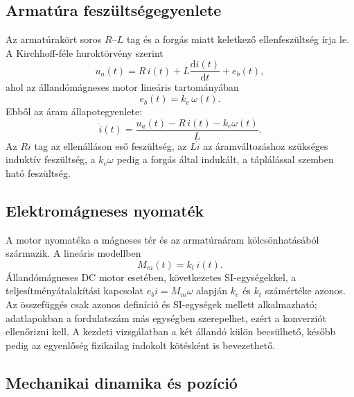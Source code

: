 \documentclass[11pt,a4paper]{article}
\newcommand{\dd}{\mathrm{d}}
\begin{document}
\subsection{Armatúra feszültségegyenlete}

Az armatúrakört soros $R$--$L$ tag és a forgás miatt keletkező ellenfeszültség írja le. A Kirchhoff-féle huroktörvény szerint
\begin{equation}
  u_a(t)=R\,i(t)+L\frac{\dd i(t)}{\dd t}+e_b(t),
  \label{eq:armature}
\end{equation}
ahol az állandómágneses motor lineáris tartományában
\begin{equation}
  e_b(t)=k_e\,\omega(t).
  \label{eq:backemf}
\end{equation}
Ebből az áram állapotegyenlete:
\begin{equation}
  \dot{i}(t)=\frac{u_a(t)-R\,i(t)-k_e\omega(t)}{L}.
  \label{eq:idot}
\end{equation}
Az $Ri$ tag az ellenálláson eső feszültség, az $L\dot{i}$ az áramváltozáshoz szükséges induktív feszültség, a $k_e\omega$ pedig a forgás által indukált, a táplálással szemben ható feszültség.

\subsection{Elektromágneses nyomaték}

A motor nyomatéka a mágneses tér és az armatúraáram kölcsönhatásából származik. A lineáris modellben
\begin{equation}
  M_m(t)=k_t\,i(t).
  \label{eq:torque}
\end{equation}
Állandómágneses DC motor esetében, következetes SI-egységekkel, a teljesítményátalakítási kapcsolat $e_b i=M_m\omega$ alapján $k_e$ és $k_t$ számértéke azonos. Az összefüggés csak azonos definíció és SI-egységek mellett alkalmazható; adatlapokban a fordulatszám más egységben szerepelhet, ezért a konverziót ellenőrizni kell. A kezdeti vizsgálatban a két állandó külön becsülhető, később pedig az egyenlőség fizikailag indokolt kötésként is bevezethető.

\subsection{Mechanikai dinamika és pozíció}
\end{document}
